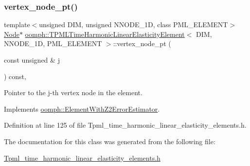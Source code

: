\subsubsection{\texorpdfstring{vertex\+\_\+node\+\_\+pt()}{vertex\_node\_pt()}}
{\footnotesize\ttfamily template$<$unsigned D\+IM, unsigned N\+N\+O\+D\+E\+\_\+1D, class P\+M\+L\+\_\+\+E\+L\+E\+M\+E\+NT$>$ \\
\hyperlink{classoomph_1_1Node}{Node}$\ast$ \hyperlink{classoomph_1_1TPMLTimeHarmonicLinearElasticityElement}{oomph\+::\+T\+P\+M\+L\+Time\+Harmonic\+Linear\+Elasticity\+Element}$<$ D\+IM, N\+N\+O\+D\+E\+\_\+1D, P\+M\+L\+\_\+\+E\+L\+E\+M\+E\+NT $>$\+::vertex\+\_\+node\+\_\+pt (\begin{DoxyParamCaption}\item[{const unsigned \&}]{j }\end{DoxyParamCaption}) const\hspace{0.3cm}{\ttfamily [inline]}, {\ttfamily [virtual]}}



Pointer to the j-\/th vertex node in the element. 



Implements \hyperlink{classoomph_1_1ElementWithZ2ErrorEstimator_a0eedccc33519f852c5dc2055ddf2774b}{oomph\+::\+Element\+With\+Z2\+Error\+Estimator}.



Definition at line 125 of file Tpml\+\_\+time\+\_\+harmonic\+\_\+linear\+\_\+elasticity\+\_\+elements.\+h.



The documentation for this class was generated from the following file\+:\begin{DoxyCompactItemize}
\item 
\hyperlink{Tpml__time__harmonic__linear__elasticity__elements_8h}{Tpml\+\_\+time\+\_\+harmonic\+\_\+linear\+\_\+elasticity\+\_\+elements.\+h}\end{DoxyCompactItemize}

